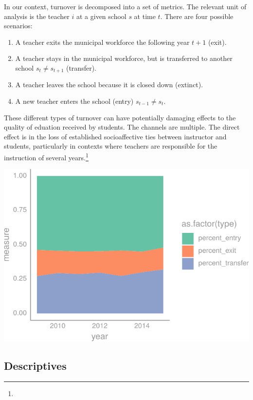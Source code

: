 \documentclass[12pt,]{article}
\providecommand{\tightlist}{%
  \setlength{\itemsep}{0pt}\setlength{\parskip}{0pt}}
\let\rmarkdownfootnote\footnote%
\def\footnote{\protect\rmarkdownfootnote}
\begin{document}
In our context, turnover is decomposed into a set of metrics. The
relevant unit of analysis is the teacher \(i\) at a given school \(s\)
at time \(t\). There are four possible scenarios:

\begin{enumerate}
\def\labelenumi{\arabic{enumi})}
\tightlist
\item
  A teacher exits the municipal workforce the following year \(t+1\)
  (exit).
\item
  A teacher stays in the municipal workforce, but is transferred to
  another school \(s_t \neq s_{t+1}\) (transfer).
\item
  A teacher leaves the school because it is closed down (extinct).
\item
  A new teacher enters the school (entry) \(s_{t-1} \neq s_{t}\).
\end{enumerate}

These different types of turnover can have potentially damaging effects
to the quality of eduation received by students. The channels are
multiple. The direct effect is in the loss of established socioaffective
ties between instructor and students, particularly in contexts where
teachers are responsible for the instruction of several years.\footnote{}

\begin{center}\includegraphics{dissertation_files/figure-latex/unnamed-chunk-30-1} \end{center}

\hypertarget{descriptives}{%
\subsection{Descriptives}\label{descriptives}}
\end{document}
